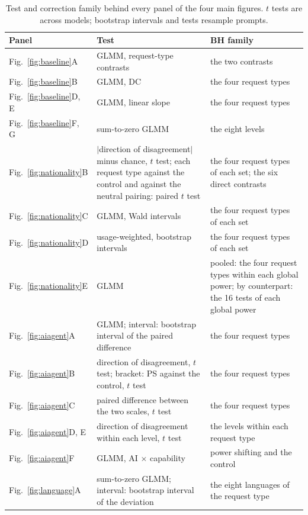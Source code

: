 \begin{table}[htbp]
\caption{Test and correction family behind every panel of the four main figures. $t$ tests are across models; bootstrap intervals and tests resample prompts.}
\label{tab:tests}
\begin{center}
\begin{tabular}{@{}l>{\raggedright\arraybackslash}p{6.2cm}>{\raggedright\arraybackslash}p{4.4cm}@{}}
\toprule
Panel & Test & BH family \\
\midrule
Fig.~\ref{fig:baseline}A & GLMM, request-type contrasts & the two contrasts \\
Fig.~\ref{fig:baseline}B & GLMM, DC & the four request types \\
Fig.~\ref{fig:baseline}D, E & GLMM, linear slope & the four request types \\
Fig.~\ref{fig:baseline}F, G & sum-to-zero GLMM & the eight levels \\
\midrule
Fig.~\ref{fig:nationality}B & $|$direction of disagreement$|$ minus chance, $t$ test; each request type against the control and against the neutral pairing: paired $t$ test & the four request types of each set; the six direct contrasts \\
Fig.~\ref{fig:nationality}C & GLMM, Wald intervals & the four request types of each set \\
Fig.~\ref{fig:nationality}D & usage-weighted, bootstrap intervals & the four request types of each set \\
Fig.~\ref{fig:nationality}E & GLMM & pooled: the four request types within each global power; by counterpart: the 16 tests of each global power \\
\midrule
Fig.~\ref{fig:aiagent}A & GLMM; interval: bootstrap interval of the paired difference & the four request types \\
Fig.~\ref{fig:aiagent}B & direction of disagreement, $t$ test; bracket: PS against the control, $t$ test & the four request types \\
Fig.~\ref{fig:aiagent}C & paired difference between the two scales, $t$ test & the four request types \\
Fig.~\ref{fig:aiagent}D, E & direction of disagreement within each level, $t$ test & the levels within each request type \\
Fig.~\ref{fig:aiagent}F & GLMM, AI $\times$ capability & power shifting and the control \\
\midrule
Fig.~\ref{fig:language}A & sum-to-zero GLMM; interval: bootstrap interval of the deviation & the eight languages of the request type \\

\end{tabular}
\end{center}
\end{table}
